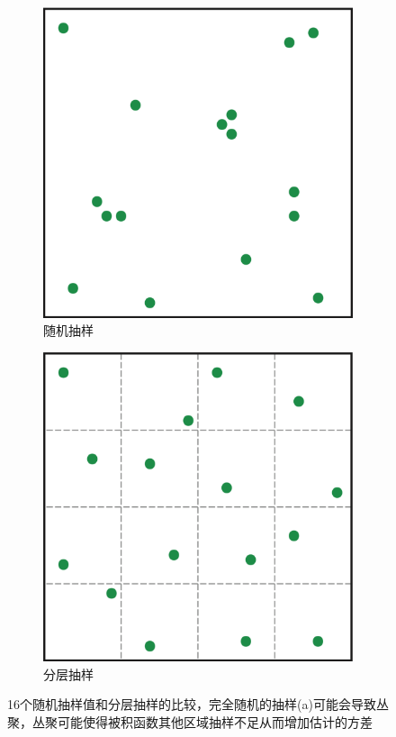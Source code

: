 \begin{figure}
\sidecaption
	{\begin{subfigure}[b]{0.3\textwidth}
		\includegraphics[width=1.\textwidth]{figures/mc/mc-12-1}
		\caption{随机抽样}
	\end{subfigure}
	\begin{subfigure}[b]{0.3\textwidth}
		\includegraphics[width=1.\textwidth]{figures/mc/mc-12-2}
		\caption{分层抽样}
	\end{subfigure}}
	\caption{16个随机抽样值和分层抽样的比较，完全随机的抽样(a)可能会导致丛聚，丛聚可能使得被积函数其他区域抽样不足从而增加估计的方差}
	\label{f:placement}
\end{figure}


